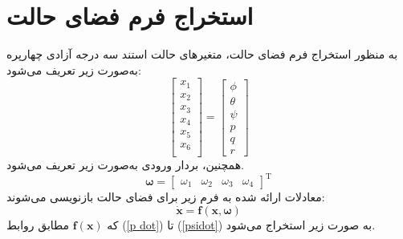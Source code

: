 \section{استخراج فرم فضای حالت}\label{spacestate}
به منظور استخراج فرم فضای حالت، متغیرهای حالت استند سه درجه آزادی چهارپره به‌صورت زیر تعریف می‌شود:
\begin{equation}
	\begin{bmatrix}
		x_1\\x_2\\x_3\\x_4\\x_5\\x_6\\
	\end{bmatrix} = 
\begin{bmatrix}
	\phi\\ \theta \\ \psi \\ p\\ q\\ r
\end{bmatrix}
\end{equation}
همچنین، بردار ورودی به‌صورت زیر تعریف می‌شود.
\begin{equation}
	\boldsymbol{\omega} = \begin{bmatrix}
		\omega_1&\omega_2&\omega_3&\omega_4
	\end{bmatrix}^\mathrm{T}
\end{equation}
معادلات ارائه شده به فرم زیر برای فضای حالت بازنویسی می‌شوند:
\begin{equation}
	\boldsymbol{\dot x} = \boldsymbol f(\boldsymbol x, \boldsymbol{\omega})
\end{equation}
که $\boldsymbol f(\boldsymbol x)$ مطابق روابط
(\ref{p dot})
تا
(\ref{psidot})
به صورت زیر استخراج می‌شود.
